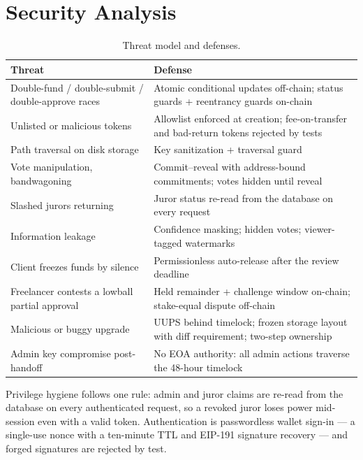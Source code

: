 \documentclass[11pt,letterpaper]{article}
\begin{document}
\section{Security Analysis}\label{sec:security}

\begin{table}[h]
\centering\small
\caption{Threat model and defenses.}
\label{tab:threats}
\begin{tabular}{@{}p{}p{}@{}}
\toprule
\textbf{Threat} & \textbf{Defense} \\
\midrule
Double-fund / double-submit / double-approve races & Atomic conditional updates off-chain; status guards + reentrancy guards on-chain \\
Unlisted or malicious tokens & Allowlist enforced at creation; fee-on-transfer and bad-return tokens rejected by tests \\
Path traversal on disk storage & Key sanitization + traversal guard \\
Vote manipulation, bandwagoning & Commit--reveal with address-bound commitments; votes hidden until reveal \\
Slashed jurors returning & Juror status re-read from the database on every request \\
Information leakage & Confidence masking; hidden votes; viewer-tagged watermarks \\
Client freezes funds by silence & Permissionless auto-release after the review deadline \\
Freelancer contests a lowball partial approval & Held remainder + challenge window on-chain; stake-equal dispute off-chain \\
Malicious or buggy upgrade & UUPS behind timelock; frozen storage layout with diff requirement; two-step ownership \\
Admin key compromise post-handoff & No EOA authority: all admin actions traverse the 48-hour timelock \\
\bottomrule
\end{tabular}
\end{table}

Privilege hygiene follows one rule: admin and juror claims are re-read from the
database on every authenticated request, so a revoked juror loses power mid-session
even with a valid token. Authentication is passwordless wallet sign-in --- a
single-use nonce with a ten-minute TTL and EIP-191 signature recovery --- and forged
signatures are rejected by test.
\end{document}
